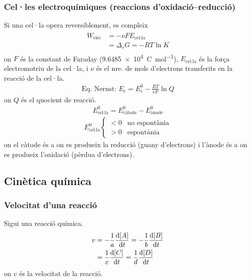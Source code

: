 \subsubsection*{Cel·les electroquímiques (reaccions d'oxidació--reducció)}
Si una cel·la opera reversiblement, es compleix
\begin{align}
\begin{aligned}
    W_{\text{elec}} &= - \nu F E_{\text{cel·la}} \\ &= \Delta_{r} G = - RT \ln K
\end{aligned}
\end{align}
on $F$ és la constant de Faraday (\SI{9.6485 e4}{\coulomb \per \mol}), $E_{\text{cel·la}}$ és la for\c{c}a electromotriu de la cel·la, i $\nu$ és el nre. de mols d'electrons transferits en la reacció de la cel·la.
\begin{align}
    \text{Eq. Nernst: } E_{\text{c}} = E^{0}_{\text{c}} - \frac{RT}{\nu F} \ln Q
\end{align}
on $Q$ és el quocient de reacció.
\begin{align}
    E^{0}_{\text{cel·la}} = E^{0}_{\text{càtode}} - E^{0}_{\text{ànode}}
\end{align}
\begin{align*}
    E^{0}_{\text{cel·la}}   \begin{cases} < 0 & \text{no espontània} \\ > 0 & \text{espontània} \end{cases}
\end{align*}
on el càtode és a on es produeix la reducció (guany d'electrons) i l'ànode és a on es produeix l'oxidació (pèrdua d'electrons).
\subsection{Cinètica química}
\subsubsection*{Velocitat d'una reacció}
Sigui  una reacció química.
\begin{align}
\begin{aligned}
    v &= -\frac{1}{a} \frac{\mathrm{d} [A]}{\mathrm{d} t} = -\frac{1}{b} \frac{\mathrm{d} [B]}{\mathrm{d} t} \\ &= \frac{1}{c} \frac{\mathrm{d} [C]}{\mathrm{d} t} = \frac{1}{d} \frac{\mathrm{d} [D]}{\mathrm{d} t}
\end{aligned}
\end{align}
on $v$ és la velocitat de la reacció.
